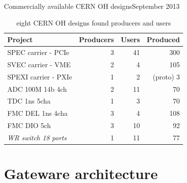 \documentclass[compress,red]{beamer}
\begin{document}
\begin{frame}{Commercially available CERN OH designs}{September 2013}

  \begin{table}
    \centering
    \begin{tabular}{|l||r|r|r|}
      \hline
      Project & Producers & Users & Produced\\
      \hline\hline
      SPEC carrier - PCIe & 3 & 41 & 300 \\
      \hline
      SVEC carrier - VME & 2 & 4 & 105 \\
      \hline
      SPEXI carrier - PXIe & 1 & 2 & (proto) 3 \\
      \hline
      \hline
      ADC 100M 14b 4ch & 2 & 11 & 70 \\
      \hline
      TDC 1ns 5cha & 1 & 3 & 70 \\
      \hline
      FMC DEL 1ns 4cha & 3 & 4 & 108 \\
      \hline
      FMC DIO 5ch & 3 & 10 & 92 \\
      \hline
      \hline
      \textit{WR switch 18 ports} & 1 & 11 & 77\\
      \hline
    \end{tabular}
    \caption{eight CERN OH designs found producers and users}
  \end{table}


\end{frame}


\section{Gateware architecture}

\subsection*{} %
\end{document}
